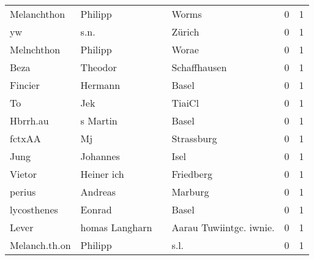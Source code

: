 \begin{tabular}{llllrr}
              Melanchthon &                            Philipp &             &                                       Worms &          0 &         1 \\
                       yw &                               s.n. &             &                                      Zürich &          0 &         1 \\
               Melnchthon &                            Philipp &             &                                       Worae &          0 &         1 \\
                     Beza &                            Theodor &             &                                Schaffhausen &          0 &         1 \\
                  Fincier &                            Hermann &             &                                       Basel &          0 &         1 \\
                       To &                                Jek &             &                                      TiaiCl &          0 &         1 \\
                 Hbrrh.au &                           s Martin &             &                                       Basel &          0 &         1 \\
                   fctxAA &                                 Mj &             &                                  Strassburg &          0 &         1 \\
                     Jung &                           Johannes &             &                                        Isel &          0 &         1 \\
                   Vietor &                         Heiner ich &             &                                   Friedberg &          0 &         1 \\
                   perius &                            Andreas &             &                                     Marburg &          0 &         1 \\
              lycosthenes &                             Eonrad &             &                                       Basel &          0 &         1 \\
                    Lever &                     homas Langharn &             &                    Aarau Tuwiintgc. iwnie.  &          0 &         1 \\
            Melanch.th.on &                            Philipp &             &                                        s.l. &          0 &         1 \\

\end{tabular}
